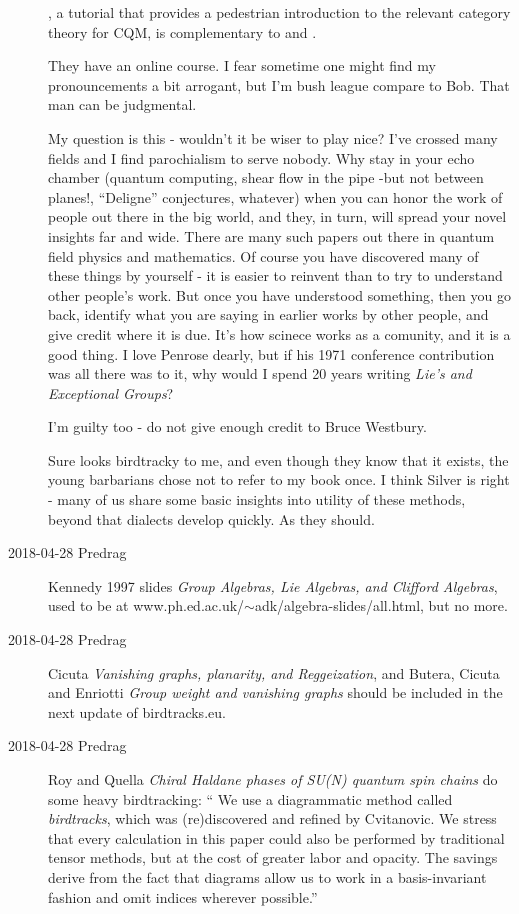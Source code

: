 \begin{description}
, a tutorial that provides a pedestrian introduction to the
relevant category theory for CQM, is complementary to  and
.

They have an  {online
course}. I fear sometime one might find
 {my
pronouncements} a bit arrogant, but I'm bush league compare to Bob. That man
can be judgmental.

My question is this - wouldn't it be wiser to play nice? I've crossed many
fields and I find parochialism to serve nobody. Why stay in your echo chamber
(quantum computing, shear flow in the pipe -but not between planes!,
``Deligne'' conjectures, whatever) when you can honor the work of people out
there in the big world, and they, in turn, will spread your novel insights far
and wide. There are many such papers out there in quantum field physics and
mathematics. Of course you have discovered many of these things by yourself -
it is easier to reinvent than to try to understand other people's work. But
once you have understood something, then you go back, identify what you are
saying in earlier works by other people, and give credit where it is due. It's
how scinece works as a comunity, and it is a good thing. I love Penrose dearly,
but if his 1971 conference contribution was all there was to
it, why would I spend 20 years writing {\em Lie’s and Exceptional Groups}?

I'm guilty too - do not give enough credit to Bruce Westbury.

Sure looks birdtracky to me, and even though they know that it exists, the
young barbarians chose not to refer to my book once. I think
Silver is right - many of us share some basic insights into
utility of these methods, beyond that dialects develop quickly. As they should.

\item[2018-04-28 Predrag]
Kennedy 1997 slides
{\em Group Algebras, {Lie} Algebras, and {Clifford} Algebras},
used to be at www.ph.ed.ac.uk/$\sim$adk/algebra-slides/all.html, but no more.

\item[2018-04-28 Predrag]
Cicuta {\em Vanishing graphs, planarity, and {Reggeization}},
and
Butera, Cicuta and Enriotti {\em Group weight and vanishing graphs}
should be included in the next update of birdtracks.eu.

\item[2018-04-28 Predrag]
Roy and Quella
{\em Chiral Haldane phases of {SU}(N) quantum spin chains}
do some heavy birdtracking: ``
We  use  a  diagrammatic  method  called \emph{birdtracks},  which
was (re)discovered and refined by Cvitanovic. We stress
that every calculation in this paper could also be performed
by traditional tensor methods, but at the cost of greater labor
and opacity. The savings derive from the fact that diagrams
allow us to work in a basis-invariant fashion and omit indices
wherever possible.''


\end{description}

